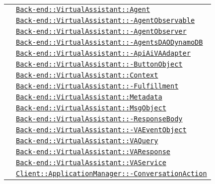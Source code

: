 \begin{longtable}{|>{\centering}m{3cm}|m{10cm}<{\centering}|}
& \hyperref[Back-end::VirtualAssistant::Agent]{\texttt{Back-end::VirtualAssistant::Agent}}\\
& \hyperref[Back-end::VirtualAssistant::AgentObservable]{\texttt{Back-end::VirtualAssistant::-\linebreak AgentObservable}}\\
& \hyperref[Back-end::VirtualAssistant::AgentObserver]{\texttt{Back-end::VirtualAssistant::-\linebreak AgentObserver}}\\
& \hyperref[Back-end::VirtualAssistant::AgentsDAODynamoDB]{\texttt{Back-end::VirtualAssistant::-\linebreak AgentsDAODynamoDB}}\\
& \hyperref[Back-end::VirtualAssistant::ApiAiVAAdapter]{\texttt{Back-end::VirtualAssistant::-\linebreak ApiAiVAAdapter}}\\
& \hyperref[Back-end::VirtualAssistant::ButtonObject]{\texttt{Back-end::VirtualAssistant::-\linebreak ButtonObject}}\\
& \hyperref[Back-end::VirtualAssistant::Context]{\texttt{Back-end::VirtualAssistant::Context}}\\
& \hyperref[Back-end::VirtualAssistant::Fulfillment]{\texttt{Back-end::VirtualAssistant::-\linebreak Fulfillment}}\\
& \hyperref[Back-end::VirtualAssistant::Metadata]{\texttt{Back-end::VirtualAssistant::Metadata}}\\
& \hyperref[Back-end::VirtualAssistant::MsgObject]{\texttt{Back-end::VirtualAssistant::MsgObject}}\\
& \hyperref[Back-end::VirtualAssistant::ResponseBody]{\texttt{Back-end::VirtualAssistant::-\linebreak ResponseBody}}\\
& \hyperref[Back-end::VirtualAssistant::VAEventObject]{\texttt{Back-end::VirtualAssistant::-\linebreak VAEventObject}}\\
& \hyperref[Back-end::VirtualAssistant::VAQuery]{\texttt{Back-end::VirtualAssistant::VAQuery}}\\
& \hyperref[Back-end::VirtualAssistant::VAResponse]{\texttt{Back-end::VirtualAssistant::VAResponse}}\\
& \hyperref[Back-end::VirtualAssistant::VAService]{\texttt{Back-end::VirtualAssistant::VAService}}\\
& \hyperref[Client::ApplicationManager::ConversationAction]{\texttt{Client::ApplicationManager::-\linebreak ConversationAction}}\\

\end{longtable}
